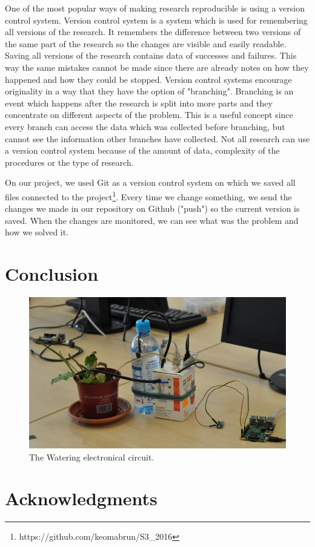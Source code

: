 \documentclass[conference]{IEEEtran}
\begin{document}
One of the most popular ways of making research reproducible is using a version control system.
Version control system is a system which is used for remembering all versions of the research.
It remembers the difference between two versions of the same part of the research so the changes are visible and easily readable.
Saving all versions of the research contains data of successes and failures.
This way the same mistakes cannot be made since there are already notes on how they happened and how they could be stopped.
Version control systems encourage originality in a way that they have the option of "branching".
Branching is an event which happens after the research is split into more parts and they concentrate on different aspects of the problem.
This is a useful concept since every branch can access the data which was collected before branching, but cannot see the information other branches have collected.
Not all research can use a version control system because of the amount of data, complexity of the procedures or the type of research.


On our project, we used Git as a version control system on which we saved all files connected to the project\footnote{https://github.com/keomabrun/S3_2016}.
Every time we change something, we send the changes we made in our repository on Github ("push") so the current version is saved.
When the changes are monitored, we can see what was the problem and how we solved it.


\section{Conclusion}
\label{sec:conclusion}

\begin{figure}
    \centering
    \includegraphics[width=\columnwidth]{final_box}
    \caption{The Watering electronical circuit.}
    \label{fig:final_box}
\end{figure}
\section*{Acknowledgments}





\begin{thebibliography}{10}
    \bibitem{}
    
\end{thebibliography}
\end{document}
